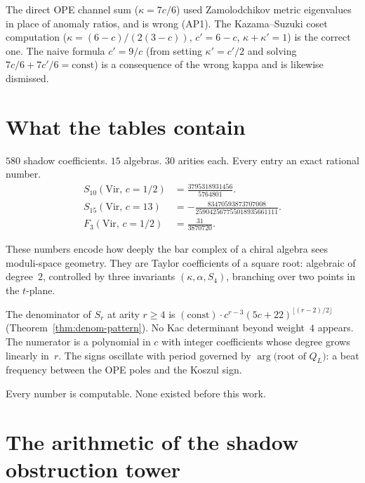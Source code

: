 \documentclass[11pt]{article}
\begin{document}
\begin{warning}\label{warn:n2-conflict}
The direct OPE channel sum ($\kappa = 7c/6$) used
Zamolodchikov metric eigenvalues in place of anomaly ratios,
and is wrong (AP1).  The Kazama--Suzuki coset computation
($\kappa = (6{-}c)/(2(3{-}c))$, $c' = 6 - c$,
$\kappa + \kappa' = 1$) is the correct one.  The naive
formula $c' = 9/c$ (from setting $\kappa' = c'/2$ and
solving $7c/6 + 7c'/6 = \text{const}$) is a consequence of
the wrong kappa and is likewise dismissed.
\end{warning}


\section{What the tables contain}
\label{sec:tables}

$580$ shadow coefficients.  $15$ algebras.  $30$ arities each.
Every entry an exact rational number.
\begin{align*}
S_{10}(\mathrm{Vir},\, c = 1/2)
  &= \frac{3795318931456}{5764801}. \\[6pt]
S_{15}(\mathrm{Vir},\, c = 13)
  &= -\frac{83470593873707008}{259042567755018935661111}. \\[6pt]
F_3(\mathrm{Vir},\, c = 1/2)
  &= \frac{31}{3870720}.
\end{align*}

These numbers encode how deeply the bar complex of a chiral
algebra sees moduli-space geometry.  They are Taylor coefficients
of a square root: algebraic of degree~$2$, controlled by three
invariants $(\kappa, \alpha, S_4)$, branching over two points in
the $t$-plane.

The denominator of $S_r$ at arity $r \geq 4$ is
$(\mathrm{const}) \cdot c^{r-3}(5c+22)^{\lfloor(r-2)/2\rfloor}$
(Theorem~\ref{thm:denom-pattern}).  No Kac determinant beyond
weight~$4$ appears.  The numerator is a polynomial in $c$ with
integer coefficients whose degree grows linearly in~$r$.  The
signs oscillate with period governed by
$\arg\bigl(\text{root of } Q_L\bigr)$: a beat frequency between
the OPE poles and the Koszul sign.

Every number is computable.  None existed before this work.


\section{The arithmetic of the shadow obstruction tower}
\label{sec:arithmetic-shadow-tower}
\end{document}
